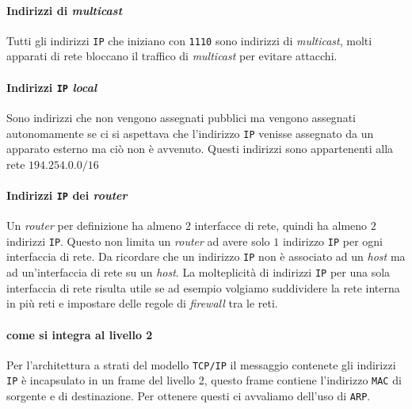            \paragraph{Indirizzi di \textit{multicast}} Tutti gli indirizzi \texttt{IP} che iniziano con \texttt{1110} sono indirizzi di \textit{multicast}, molti apparati di rete bloccano il traffico di \textit{multicast} per evitare attacchi.
            \paragraph{Indirizzi \texttt{IP} \textit{local}} Sono indirizzi che non vengono assegnati pubblici ma vengono assegnati autonomamente se ci si aspettava che l'indirizzo \texttt{IP} venisse assegnato da un apparato esterno ma ciò non è avvenuto. Questi indirizzi sono appartenenti alla rete $194.254.0.0/16$ 
            \paragraph{Indirizzi \texttt{IP} dei \textit{router}} Un \textit{router} per definizione ha almeno $2$ interfacce di rete, quindi ha almeno $2$ indirizzi \texttt{IP}. Questo non limita un \textit{router} ad avere solo $1$ indirizzo \texttt{IP} per ogni interfaccia di rete. Da ricordare che un indirizzo \texttt{IP} non è associato ad un \textit{host} ma ad un'interfaccia di rete su un \textit{host}. La molteplicità di indirizzi \texttt{IP} per una sola interfaccia di rete risulta utile se ad esempio volgiamo suddividere la rete interna in più reti e impostare delle regole di \textit{firewall} tra le reti.
            \paragraph{come si integra al livello 2} Per l'architettura a strati del modello \texttt{TCP/IP} il messaggio contenete gli indirizzi \texttt{IP} è incapsulato in un frame del livello 2, questo frame contiene l'indirizzo \texttt{MAC} di sorgente e di destinazione. Per ottenere questi ci avvaliamo dell'uso di \texttt{ARP}.
